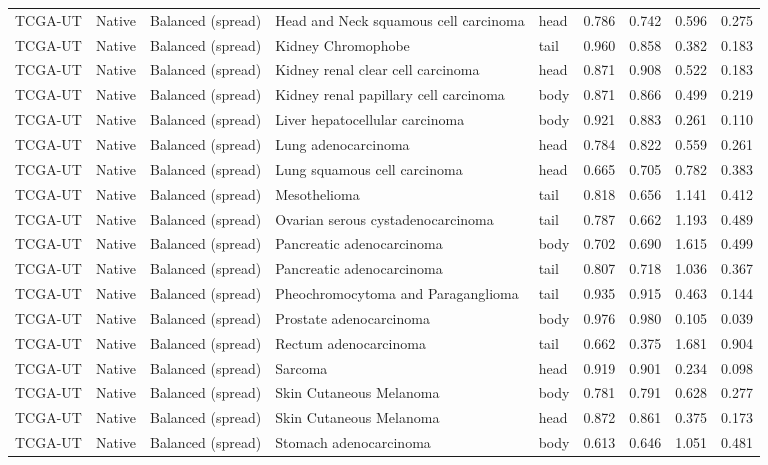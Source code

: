 \begin{longtable}{lllllrrrr}
TCGA-UT & Native & Balanced (spread) & Head and Neck squamous cell carcinoma & head & 0.786 & 0.742 & 0.596 & 0.275 \\
TCGA-UT & Native & Balanced (spread) & Kidney Chromophobe & tail & 0.960 & 0.858 & 0.382 & 0.183 \\
TCGA-UT & Native & Balanced (spread) & Kidney renal clear cell carcinoma & head & 0.871 & 0.908 & 0.522 & 0.183 \\
TCGA-UT & Native & Balanced (spread) & Kidney renal papillary cell carcinoma & body & 0.871 & 0.866 & 0.499 & 0.219 \\
TCGA-UT & Native & Balanced (spread) & Liver hepatocellular carcinoma & body & 0.921 & 0.883 & 0.261 & 0.110 \\
TCGA-UT & Native & Balanced (spread) & Lung adenocarcinoma & head & 0.784 & 0.822 & 0.559 & 0.261 \\
TCGA-UT & Native & Balanced (spread) & Lung squamous cell carcinoma & head & 0.665 & 0.705 & 0.782 & 0.383 \\
TCGA-UT & Native & Balanced (spread) & Mesothelioma & tail & 0.818 & 0.656 & 1.141 & 0.412 \\
TCGA-UT & Native & Balanced (spread) & Ovarian serous cystadenocarcinoma & tail & 0.787 & 0.662 & 1.193 & 0.489 \\
TCGA-UT & Native & Balanced (spread) & Pancreatic adenocarcinoma & body & 0.702 & 0.690 & 1.615 & 0.499 \\
TCGA-UT & Native & Balanced (spread) & Pancreatic adenocarcinoma & tail & 0.807 & 0.718 & 1.036 & 0.367 \\
TCGA-UT & Native & Balanced (spread) & Pheochromocytoma and Paraganglioma & tail & 0.935 & 0.915 & 0.463 & 0.144 \\
TCGA-UT & Native & Balanced (spread) & Prostate adenocarcinoma & body & 0.976 & 0.980 & 0.105 & 0.039 \\
TCGA-UT & Native & Balanced (spread) & Rectum adenocarcinoma & tail & 0.662 & 0.375 & 1.681 & 0.904 \\
TCGA-UT & Native & Balanced (spread) & Sarcoma & head & 0.919 & 0.901 & 0.234 & 0.098 \\
TCGA-UT & Native & Balanced (spread) & Skin Cutaneous Melanoma & body & 0.781 & 0.791 & 0.628 & 0.277 \\
TCGA-UT & Native & Balanced (spread) & Skin Cutaneous Melanoma & head & 0.872 & 0.861 & 0.375 & 0.173 \\
TCGA-UT & Native & Balanced (spread) & Stomach adenocarcinoma & body & 0.613 & 0.646 & 1.051 & 0.481 \\

\end{longtable}
